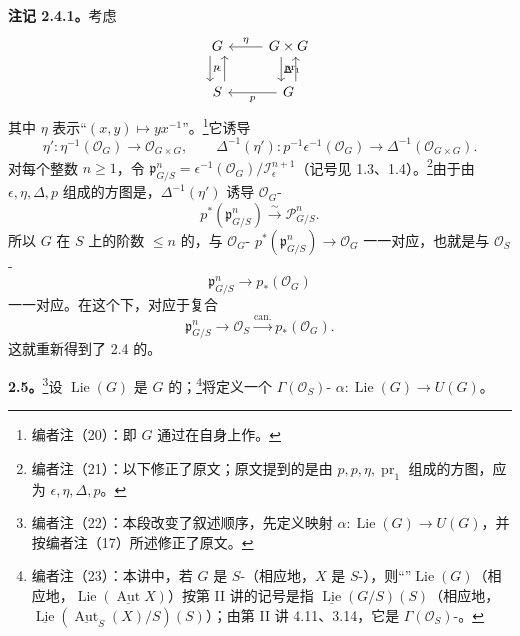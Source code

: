 \textbf{注记 2.4.1。}考虑
\[
\begin{tikzcd}
G\arrow[d,"p",shift right=1.2ex]&G\times G\arrow[l,"\eta"']\arrow[d,"\operatorname{pr}_1",shift right=1.2ex]\\
S\arrow[u,"\epsilon",shift right=1.2ex]\arrow[ur,phantom,"\ "]&G\arrow[l,"p"]\arrow[u,"\Delta",shift right=1.2ex]
\end{tikzcd}
\]
其中 $\eta$ 表示“$(x,y)\mapsto yx^{-1}$”。\footnote{编者注（20）：即 $G$ 通过在自身上作。}它诱导
\[
\eta':\eta^{-1}(\mathcal O_G)\to\mathcal O_{G\times G},\qquad
\Delta^{-1}(\eta'):p^{-1}\epsilon^{-1}(\mathcal O_G)\to\Delta^{-1}(\mathcal O_{G\times G}).
\]
对每个整数 $n\geq1$，令 $\mathfrak p_{G/S}^n=\epsilon^{-1}(\mathcal O_G)/\mathcal I_\epsilon^{n+1}$（记号见 1.3、1.4）。\footnote{编者注（21）：以下修正了原文；原文提到的是由 $p,p,\eta,\operatorname{pr}_1$ 组成的方图，应为 $\epsilon,\eta,\Delta,p$。}由于由 $\epsilon,\eta,\Delta,p$ 组成的方图是，$\Delta^{-1}(\eta')$ 诱导 $\mathcal O_G$-
\[
p^*(\mathfrak p_{G/S}^n)\xrightarrow{\sim}\mathcal P_{G/S}^n.
\]
所以 $G$ 在 $S$ 上的阶数 $\leq n$ 的，与 $\mathcal O_G$- $p^*(\mathfrak p_{G/S}^n)\to\mathcal O_G$ 一一对应，也就是与 $\mathcal O_S$-
\[
\mathfrak p_{G/S}^n\longrightarrow p_*(\mathcal O_G)
\]
一一对应。在这个下，对应于复合
\[
\mathfrak p_{G/S}^n\longrightarrow\mathcal O_S\xrightarrow{\mathrm{can.}}p_*(\mathcal O_G).
\]
这就重新得到了 2.4 的。

\textbf{2.5。}\footnote{编者注（22）：本段改变了叙述顺序，先定义映射 $\alpha:\operatorname{Lie}(G)\to U(G)$，并按编者注（17）所述修正了原文。}设 $\operatorname{Lie}(G)$ 是 $G$ 的；\footnote{编者注（23）：本讲中，若 $G$ 是 $S$-（相应地，$X$ 是 $S$-），则“”$\operatorname{Lie}(G)$（相应地，$\operatorname{Lie}(\underline{\operatorname{Aut}}X)$）按第 II 讲的记号是指 $\underline{\operatorname{Lie}}(G/S)(S)$（相应地，$\underline{\operatorname{Lie}}(\underline{\operatorname{Aut}}_S(X)/S)(S)$）；由第 II 讲 4.11、3.14，它是 $\Gamma(\mathcal O_S)$-。}将定义一个 $\Gamma(\mathcal O_S)$- $\alpha:\operatorname{Lie}(G)\to U(G)$。

